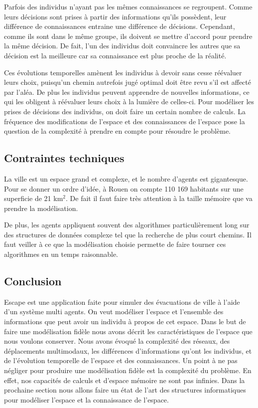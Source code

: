 \documentclass[a4paper]{article}
\begin{document}
Parfois des individus n'ayant pas les mêmes connaissances se regroupent. Comme
leurs décisions sont prises à partir des informations qu'ils possèdent, leur
différence de connaissances entraine une différence de décisions. Cependant,
comme ils sont dans le même groupe, ils doivent se mettre d'accord pour prendre
la même décision. De fait, l'un des individus doit convaincre les autres que sa
décision est la meilleure car sa connaissance est plus proche de la réalité.

Ces évolutions temporelles amènent les individus à devoir sans cesse réévaluer
leurs choix, puisqu'un chemin autrefois jugé optimal doit être revu s'il est
affecté par l'aléa. De plus les individus peuvent apprendre de nouvelles
informations, ce qui les obligent à réévaluer leurs choix à la lumière de
celles-ci. Pour modéliser les prises de décisions des individus, on doit faire
un certain nombre de calculs. La fréquence des modifications de l'espace et des
connaissances de l'espace pose la question de la complexité à prendre en compte
pour résoudre le problème.

  \subsection{Contraintes techniques}

La ville est un espace grand et complexe, et le nombre d'agents est gigantesque.
Pour se donner un ordre d'idée, à Rouen on compte 110 169 habitants sur une
superficie de 21 km$^2$. De fait il faut faire très attention à la taille
mémoire que va prendre la modélisation.

De plus, les agents appliquent souvent des algorithmes particulièrement long sur
des structures de données complexe tel que la recherche de plus court chemins.
Il faut veiller à ce que la modélisation choisie permette de faire tourner ces
algorithmes en un temps raisonnable.

  \subsection{Conclusion}

Escape est une application faite pour simuler des évacuations de ville à l'aide
d'un système multi agents. On veut modéliser l'espace et l'ensemble des
informations que peut avoir un individu à propos de cet espace. Dans le but de
faire une modélisation fidèle nous avons décrit les caractéristiques de l'espace
que nous voulons conserver. Nous avons évoqué la complexité des réseaux, des
déplacements multimodaux, les différences d'informations qu'ont les individus,
et de l'évolution temporelle de l'espace et des connaissances. Un point à ne pas
négliger pour produire une modélisation fidèle est la complexité du problème. En
effet, nos capacités de calculs et d'espace mémoire ne sont pas infinies. Dans la
prochaine section nous allons faire un état de l'art des structures
informatiques pour modéliser l'espace et la connaissance de l'espace.
\end{document}
